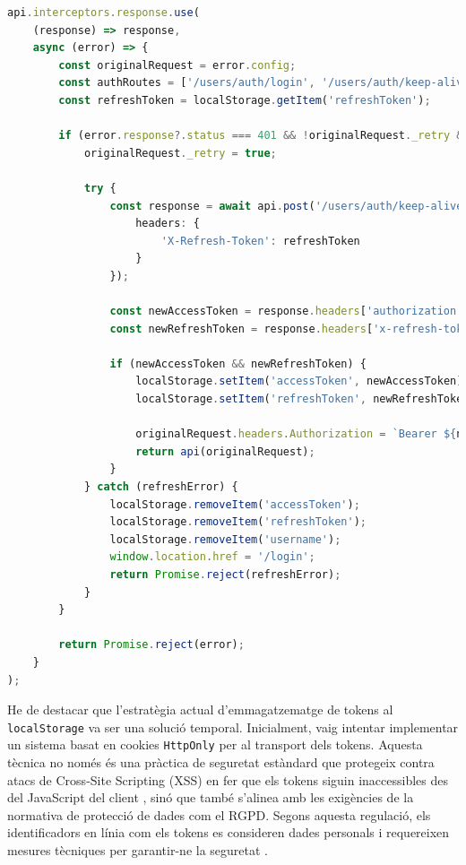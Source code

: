 \begin{lstlisting}[language=typescript, caption={Interceptor d'Axios per a la renovació automàtica de tokens a \texttt{api.ts}}]
api.interceptors.response.use(
    (response) => response,
    async (error) => {
        const originalRequest = error.config;
        const authRoutes = ['/users/auth/login', '/users/auth/keep-alive', '/users/auth/register'];
        const refreshToken = localStorage.getItem('refreshToken');

        if (error.response?.status === 401 && !originalRequest._retry && !authRoutes.includes(originalRequest.url) && refreshToken) {
            originalRequest._retry = true;

            try {
                const response = await api.post('/users/auth/keep-alive', null, {
                    headers: {
                        'X-Refresh-Token': refreshToken
                    }
                });

                const newAccessToken = response.headers['authorization']?.split(' ')[1];
                const newRefreshToken = response.headers['x-refresh-token'];

                if (newAccessToken && newRefreshToken) {
                    localStorage.setItem('accessToken', newAccessToken);
                    localStorage.setItem('refreshToken', newRefreshToken);

                    originalRequest.headers.Authorization = `Bearer ${newAccessToken}`;
                    return api(originalRequest);
                }
            } catch (refreshError) {
                localStorage.removeItem('accessToken');
                localStorage.removeItem('refreshToken');
                localStorage.removeItem('username');
                window.location.href = '/login';
                return Promise.reject(refreshError);
            }
        }

        return Promise.reject(error);
    }
);
\end{lstlisting}

He de destacar que l'estratègia actual d'emmagatzematge de tokens al \texttt{localStorage} va ser una solució temporal. Inicialment, vaig intentar implementar un sistema basat en cookies \texttt{HttpOnly} per al transport dels tokens. Aquesta tècnica no només és una pràctica de seguretat estàndard que protegeix contra atacs de Cross-Site Scripting (XSS) en fer que els tokens siguin inaccessibles des del JavaScript del client \cite{bitsrc_tokens_vs_cookies}, sinó que també s'alinea amb les exigències de la normativa de protecció de dades com el RGPD. Segons aquesta regulació, els identificadors en línia com els tokens es consideren dades personals i requereixen mesures tècniques per garantir-ne la seguretat \cite{gdpr_cookies}.

